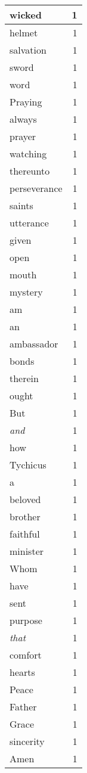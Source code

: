 \begin{center}
\begin{longtable}{l|r}
wicked & 1\\ \hline 
helmet & 1\\ \hline 
salvation & 1\\ \hline 
sword & 1\\ \hline 
word & 1\\ \hline 
Praying & 1\\ \hline 
always & 1\\ \hline 
prayer & 1\\ \hline 
watching & 1\\ \hline 
thereunto & 1\\ \hline 
perseverance & 1\\ \hline 
saints & 1\\ \hline 
utterance & 1\\ \hline 
given & 1\\ \hline 
open & 1\\ \hline 
mouth & 1\\ \hline 
mystery & 1\\ \hline 
am & 1\\ \hline 
an & 1\\ \hline 
ambassador & 1\\ \hline 
bonds & 1\\ \hline 
therein & 1\\ \hline 
ought & 1\\ \hline 
But & 1\\ \hline 
\emph{and} & 1\\ \hline 
how & 1\\ \hline 
Tychicus & 1\\ \hline 
a & 1\\ \hline 
beloved & 1\\ \hline 
brother & 1\\ \hline 
faithful & 1\\ \hline 
minister & 1\\ \hline 
Whom & 1\\ \hline 
have & 1\\ \hline 
sent & 1\\ \hline 
purpose & 1\\ \hline 
\emph{that} & 1\\ \hline 
comfort & 1\\ \hline 
hearts & 1\\ \hline 
Peace & 1\\ \hline 
Father & 1\\ \hline 
Grace & 1\\ \hline 
sincerity & 1\\ \hline 
Amen & 1\\ \hline 
\end{longtable}  
\end{center}  


